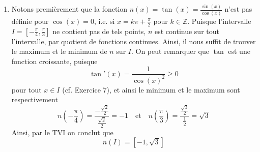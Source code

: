 \begin{exercice}
\begin{enumerate}
    Par un raisonnement similaire, on trouve que l'image de $m$ sur l'intervalle $J = ]0, 1]$ est $[1, \infty[$, et ainsi on obtient que
    \[
    m([-1, 1]) = ]\!-\!\infty, -1] \cup [1, \infty[
    \]
    
    \item Notons premièrement que la fonction $n(x) = \tan(x) = \frac{\sin(x)}{\cos(x)}$ n'est pas définie pour $\cos(x) = 0$, i.e. si $x = k\pi + \frac{\pi}{2}$ pour $k \in \mathbb{Z}$. Puisque l'intervalle $I = [-\frac{\pi}{4}, \frac{\pi}{3}]$ ne contient pas de tels points, $n$ est continue sur tout l'intervalle, par quotient de fonctions continues. Ainsi, il nous suffit de trouver le maximum et le minimum de $n$ sur $I$. On peut remarquer que $\tan$ est une fonction croissante, puisque
    \[
    \tan'(x) = \frac{1}{\cos(x)^2} \geq 0
    \]
    pour tout $x \in I$ (cf. Exercice 7), et ainsi le minimum et le maximum sont respectivement
    \[
    n\left(-\frac{\pi}{4}\right) = \frac{-\frac{\sqrt{2}}{2}}{\frac{\sqrt{2}}{2}} = -1 \quad \textrm{et} \quad n\left(\frac{\pi}{3}\right) = \frac{\frac{\sqrt{3}}{2}}{\frac{1}{2}} = \sqrt{3}
    \]
    Ainsi, par le TVI on conclut que
    \[
    n(I) = [-1, \sqrt{3}]
    \]
\end{enumerate}
\end{exercice}

